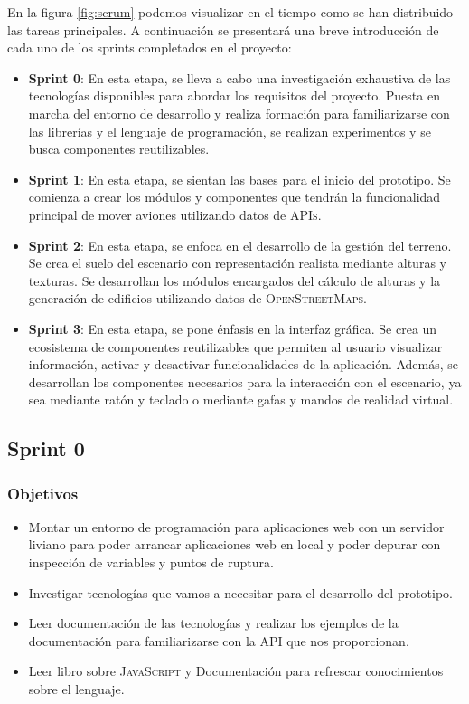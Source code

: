\documentclass[a4paper, 11pt]{book}
\begin{document}
En la figura \ref{fig:scrum} podemos visualizar en el tiempo como se han distribuido las tareas principales. A continuación se presentará una breve introducción de cada uno de los sprints completados en el proyecto:

\begin{itemize}
    \item \textbf{Sprint 0}: En esta etapa, se lleva a cabo una investigación exhaustiva de las tecnologías disponibles para abordar los requisitos del proyecto. Puesta en marcha del entorno de desarrollo y realiza formación para familiarizarse con las librerías y el lenguaje de programación, se realizan experimentos y se busca componentes reutilizables.
    \item \textbf{Sprint 1}: En esta etapa, se sientan las bases para el inicio del prototipo. Se comienza a crear los módulos y componentes que tendrán la funcionalidad principal de mover aviones utilizando datos de \textsc{\gls{API}s}.
    \item \textbf{Sprint 2}: En esta etapa, se enfoca en el desarrollo de la gestión del terreno. Se crea el suelo del escenario con representación realista mediante alturas y texturas. Se desarrollan los módulos encargados del cálculo de alturas y la generación de edificios utilizando datos de \textsc{OpenStreetMaps}.
    \item \textbf{Sprint 3}: En esta etapa, se pone énfasis en la interfaz gráfica. Se crea un ecosistema de componentes reutilizables que permiten al usuario visualizar información, activar y desactivar funcionalidades de la aplicación. Además, se desarrollan los componentes necesarios para la interacción con el escenario, ya sea mediante ratón y teclado o mediante gafas y mandos de realidad virtual.
\end{itemize}

\subsection{Sprint 0}
\subsubsection{Objetivos}
\begin{itemize}
    \item Montar un entorno de programación para aplicaciones web con un servidor liviano para poder arrancar aplicaciones web en local y poder depurar con inspección de variables y puntos de ruptura.
    \item Investigar tecnologías que vamos a necesitar para el desarrollo del prototipo.
    \item Leer documentación de las tecnologías y realizar los ejemplos de la documentación para familiarizarse con la \textsc{API} que nos proporcionan.
    \item Leer libro sobre \textsc{JavaScript} y Documentación para refrescar conocimientos sobre el lenguaje.
\end{itemize}
\end{document}
